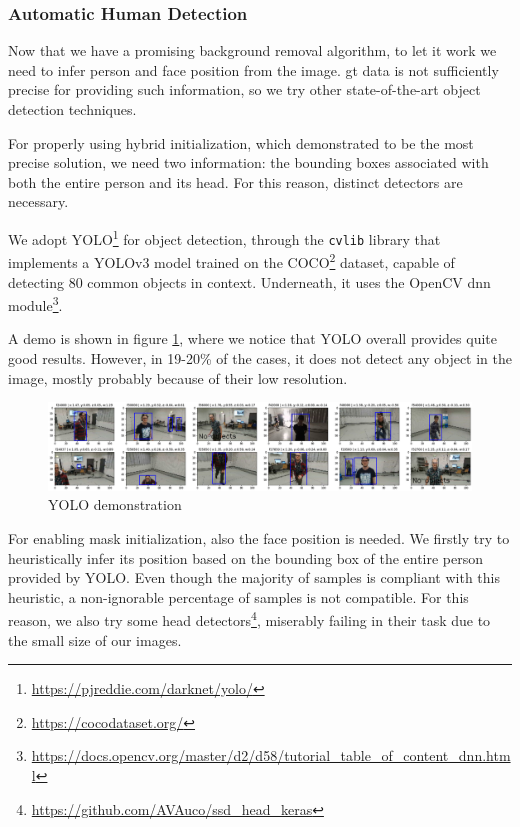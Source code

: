 \subsubsection{Automatic Human Detection}
\label{subsec:masking-yolo}

Now that we have a promising background removal algorithm, to let it work we need to infer person and face position from the image. \gls{gt} data is not sufficiently precise for providing such information, so we try other state-of-the-art object detection techniques.

For properly using hybrid initialization, which demonstrated to be the most precise solution, we need two information: the bounding boxes associated with both the entire person and its head. For this reason, distinct detectors are necessary.

We adopt YOLO\footnote{\url{https://pjreddie.com/darknet/yolo/}} for object detection, through the \texttt{cvlib} library that implements a YOLOv3 model trained on the COCO\footnote{\url{https://cocodataset.org/}} dataset, capable of detecting 80 common objects in context. Underneath, it uses the OpenCV dnn module\footnote{\url{https://docs.opencv.org/master/d2/d58/tutorial_table_of_content_dnn.html}}.

A demo is shown in figure \ref{fig:yolo}, where we notice that YOLO overall provides quite good results. However, in 19-20\% of the cases, it does not detect any object in the image, mostly probably because of their low resolution.

\begin{figure}[!h]
	\centering
	\includegraphics[width=1\textwidth]{"contents/images/04-3yolo"}
	\caption[YOLO demonstration]{YOLO demonstration}
	\label{fig:yolo}
\end{figure}

\medskip

For enabling mask initialization, also the face position is needed. We firstly try to heuristically infer its position based on the bounding box of the entire person provided by YOLO. Even though the majority of samples is compliant with this heuristic, a non-ignorable percentage of samples is not compatible. For this reason, we also try some head detectors\footnote{\url{https://github.com/AVAuco/ssd_head_keras}}, miserably failing in their task due to the small size of our images.

